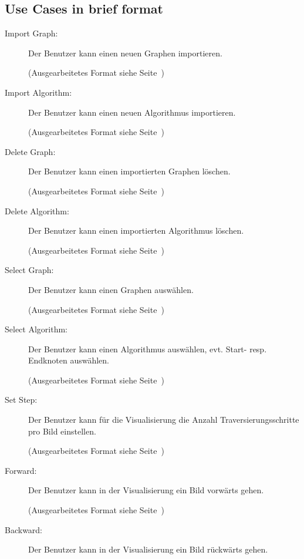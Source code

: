 \subsection{Use Cases in brief format}
\label{subsec:uc_in_brief_format}
\begin{description}
  \item[Import Graph:] Der Benutzer kann einen neuen Graphen importieren.

  (Ausgearbeitetes Format siehe Seite~\pageref{uc:Import Graph})

  \item[Import Algorithm:] Der Benutzer kann einen neuen Algorithmus importieren.

  (Ausgearbeitetes Format siehe Seite~\pageref{uc:Import Algorithm})

  \item[Delete Graph:] Der Benutzer kann einen importierten Graphen l\"oschen.

  (Ausgearbeitetes Format siehe Seite~\pageref{uc:Delete Graph})

  \item[Delete Algorithm:] Der Benutzer kann einen importierten Algorithmus l\"oschen.

  (Ausgearbeitetes Format siehe Seite~\pageref{uc:Delete Algorithm})

  \item[Select Graph:] Der Benutzer kann einen Graphen ausw\"ahlen.

  (Ausgearbeitetes Format siehe Seite~\pageref{uc:Select Graph})

  \item[Select Algorithm:] Der Benutzer kann einen Algorithmus ausw\"ahlen, evt. Start- resp. Endknoten ausw\"ahlen.

  (Ausgearbeitetes Format siehe Seite~\pageref{uc:Select Algorithm})

  \item[Set Step:] Der Benutzer kann f\"ur die Visualisierung die Anzahl Traversierungsschritte pro Bild einstellen.

  (Ausgearbeitetes Format siehe Seite~\pageref{uc:Set Step})

  \item[Forward:] Der Benutzer kann in der Visualisierung ein Bild vorw\"arts gehen.

  (Ausgearbeitetes Format siehe Seite~\pageref{uc:Forward})

  \item[Backward:] Der Benutzer kann in der Visualisierung ein Bild r\"uckw\"arts gehen.


\end{description}
